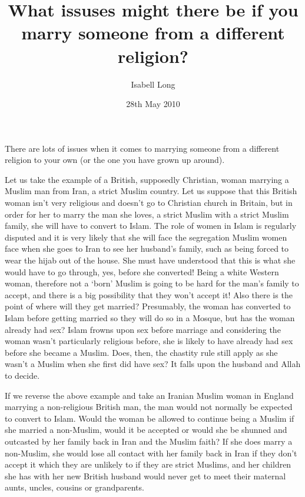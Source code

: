 \documentclass[a4paper]{article}
\begin{document}
\title{What issuses might there be if you marry someone from a different religion?}
\author{Isabell Long}
\date{28th May 2010}
\maketitle

There are lots of issues when it comes to marrying someone from a different religion to your own (or the one you have grown up around).

Let us take the example of a British, supposedly Christian, woman marrying a Muslim man from Iran, a strict Muslim country.  Let us suppose that this British woman isn't very religious and doesn't go to Christian church in Britain, but in order for her to marry the man she loves, a strict Muslim with a strict Muslim family, she will have to convert to Islam.  The role of women in Islam is regularly disputed and it is very likely that she will face the segregation Muslim women face when she goes to Iran to see her husband's family, such as being forced to wear the hijab out of the house.  She must have understood that this is what she would have to go through, yes, before she converted!  Being a white Western woman, therefore not a `born' Muslim is going to be hard for the man's family to accept, and there is a big possibility that they won't accept it!  Also there is the point of where will they get married?  Presumably, the woman has converted to Islam before getting married so they will do so in a Mosque, but has the woman already had sex?  Islam frowns upon sex before marriage and considering the woman wasn't particularly religious before, she is likely to have already had sex before she became a Muslim.  Does, then, the chastity rule still apply as she wasn't a Muslim when she first did have sex?  It falls upon the husband and Allah to decide.

If we reverse the above example and take an Iranian Muslim woman in England marrying a non-religious British man, the man would not normally be expected to convert to Islam.  Would the woman be allowed to continue being a Muslim if she married a non-Muslim, would it be accepted or would she be shunned and outcasted by her family back in Iran and the Muslim faith?  If she does marry a non-Muslim, she would lose all contact with her family back in Iran if they don't accept it which they are unlikely to if they are strict Muslims, and her children she has with her new British husband would never get to meet their maternal aunts, uncles, cousins or grandparents.
\end{document}
